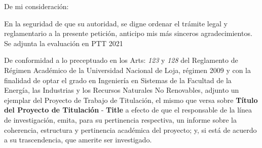 \documentclass[12pt,a4paper,sans]{moderncv}
\newcommand{\titulo}{Título del Proyecto de Titulación}
\newcommand{\tituloEng}{Title}
\begin{document}
\date{Loja, 23 de marzo del 2021}
\opening{De mi consideración:}
\closing{En la seguridad de que su autoridad, se digne ordenar el trámite legal y reglamentario a la presente petición, anticipo mis más sinceros agradecimientos. Se adjunta la evaluación en PTT 2021}
\makelettertitle

De conformidad a lo preceptuado en los Arts: \textit{123} y \textit{128} del Reglamento de Régimen Académico de la Universidad Nacional de Loja, régimen 2009 y con la finalidad de optar el grado en Ingeniería en Sistemas de la Facultad de la Energía, las Industrias y los Recursos Naturales No Renovables, adjunto un ejemplar del Proyecto de Trabajo de Titulación, el mismo que versa sobre \textbf{\titulo} - \textbf{\tituloEng} a efecto de que el responsable de la línea de investigación, emita, para su pertinencia respectiva, un informe sobre la coherencia, estructura y pertinencia académica del proyecto; y, si está de acuerdo a su trascendencia, que amerite ser investigado.

\makeletterclosing
\end{document}
